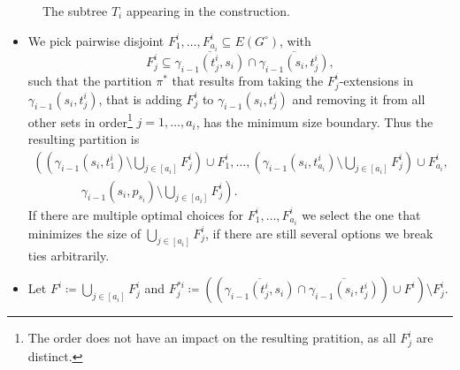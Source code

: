 \documentclass{lmcs}
\theoremstyle{plain}\newtheorem{claim}[thm]{Claim}   %
\newcommand{\complementOf}[1]{\ensuremath{\overline{#1}}}
\begin{document}
\begin{figure}
	\centering
	\caption{The subtree $T_i$ appearing in the construction.}  
	\label{fig:teeEye}
\end{figure}

\begin{itemize}
	\item We pick pairwise disjoint $F^i_1,\ldots,F^i_{a_i}\subseteq E(G^\circ)$, with \[F^i_j\subseteq \complementOf{\gamma_{i-1}(t^i_j,s_i)}\cap\complementOf{ \gamma_{i-1}(s_i,t^i_j)},\] such that the partition $\pi^*$ that results from taking the $F^i_j$-extensions in $\gamma_{i-1}(s_i,t^i_j)$, that is adding $F^i_j$ to $\gamma_{i-1}(s_i,t^i_j)$ and removing it from all other sets in order\footnote{The order does not have an impact on the resulting pratition, as all $F^i_j$ are distinct.} $j=1,\ldots,a_i$, has the minimum size boundary. Thus the resulting partition is
	\begin{equation*}
		\begin{split}
			\left(\left(\gamma_{i-1}(s_i,t^i_1)\setminus \bigcup_{j\in[a_i]} F^i_j\right)\cup F^i_1,\ldots,\left(\gamma_{i-1}(s_i,t^i_{a_i})\setminus \bigcup_{j\in[a_i]} F^i_j\right)\cup F^i_{a_i},\right.\\
			\left.\phantom{\bigcup_{j\in[a_i]}}\gamma_{i-1}(s_i,p_{s_i})\setminus\bigcup_{j\in[a_i]} F^i_j \right).
		\end{split}
	\end{equation*}
	If there are multiple optimal choices for $F^i_1,\ldots,F^i_{a_i}$ we select the one that minimizes the size of $\bigcup_{j\in[a_i]} F^i_j$, if there are still several options we break ties arbitrarily.
	\item Let $F^i\coloneqq\bigcup_{j\in[a_i]} F^i_j$ and $F^{*i}_j\coloneqq \left(\left(\complementOf{\gamma_{i-1}(t^i_j,s_i)}\cap \complementOf{\gamma_{i-1}(s_i,t^i_j)}\right)\cup F^i\right) \setminus F^i_j$.
\end{itemize}
\end{document}
